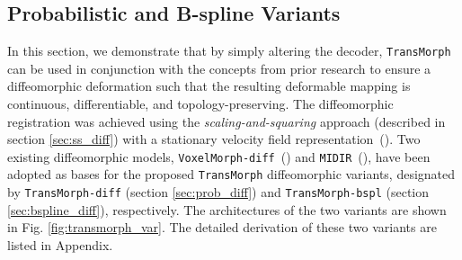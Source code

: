 \documentclass[times,twocolumn,final]{elsarticle}
\begin{document}
\subsection{Probabilistic and B-spline Variants}
\label{sec:prob_bspl}
In this section, we demonstrate that by simply altering the decoder, \texttt{TransMorph} can be used in conjunction with the concepts from prior research to ensure a diffeomorphic deformation such that the resulting deformable mapping is continuous, differentiable, and topology-preserving. The diffeomorphic registration was achieved using the \textit{scaling-and-squaring} approach (described in section \ref{sec:ss_diff}) with a stationary velocity field representation~(\cite{arsigny2006log}). Two existing diffeomorphic models, \texttt{VoxelMorph-diff}~(\cite{dalca2019unsupervised}) and \texttt{MIDIR}~(\cite{qiu2021learning}), have been adopted as bases for the proposed \texttt{TransMorph} diffeomorphic variants, designated by \texttt{TransMorph-diff} (section \ref{sec:prob_diff}) and \texttt{TransMorph-bspl} (section \ref{sec:bspline_diff}), respectively. The architectures of the two variants are shown in Fig. \ref{fig:transmorph_var}. The detailed derivation of these two variants are listed in Appendix.
\end{document}
